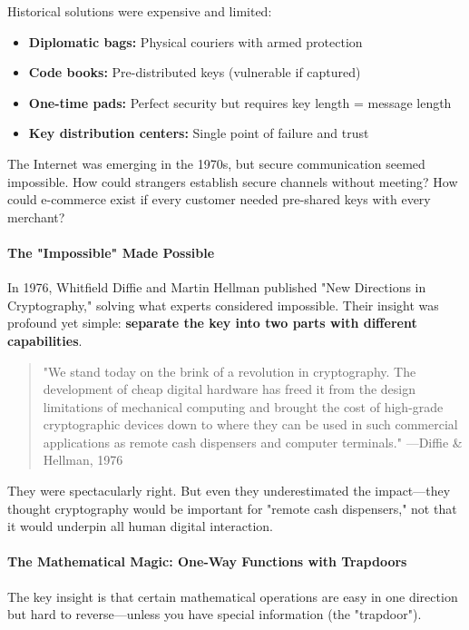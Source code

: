 \documentclass[11pt,a4paper]{article}
\begin{document}
Historical solutions were expensive and limited:
\begin{itemize}
    \item \textbf{Diplomatic bags:} Physical couriers with armed protection
    \item \textbf{Code books:} Pre-distributed keys (vulnerable if captured)
    \item \textbf{One-time pads:} Perfect security but requires key length = message length
    \item \textbf{Key distribution centers:} Single point of failure and trust
\end{itemize}

The Internet was emerging in the 1970s, but secure communication seemed impossible. How could strangers establish secure channels without meeting? How could e-commerce exist if every customer needed pre-shared keys with every merchant?

\paragraph{The "Impossible" Made Possible}

In 1976, Whitfield Diffie and Martin Hellman published "New Directions in Cryptography," solving what experts considered impossible. Their insight was profound yet simple: \textbf{separate the key into two parts with different capabilities}.

\begin{quote}
"We stand today on the brink of a revolution in cryptography. The development of cheap digital hardware has freed it from the design limitations of mechanical computing and brought the cost of high-grade cryptographic devices down to where they can be used in such commercial applications as remote cash dispensers and computer terminals." ---Diffie \& Hellman, 1976
\end{quote}

They were spectacularly right. But even they underestimated the impact---they thought cryptography would be important for "remote cash dispensers," not that it would underpin all human digital interaction.

\paragraph{The Mathematical Magic: One-Way Functions with Trapdoors}

The key insight is that certain mathematical operations are easy in one direction but hard to reverse---unless you have special information (the "trapdoor").
\end{document}
